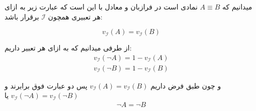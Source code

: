 \documentclass[]{exam}
\begin{document}
میدانیم که
$A \equiv B$
نمادی است در فرازبان و معادل با این است که عبارت زیر به ازای هر تعبیری همچون 
$\mathscr{I}$
برقرار باشد:

$$
v_\mathscr{I} (A) = v_\mathscr{I} (B)
$$

از طرفی میدانیم که به ازای هر تعبیر داریم:
\begin{align*}
    v_\mathscr{I} (\neg A) = 1 - v_\mathscr{I} (A)
    \\
    v_\mathscr{I} (\neg B) = 1 - v_\mathscr{I} (B)
\end{align*}


و چون طبق فرض داریم
$v_\mathscr{I} (A) = v_\mathscr{I} (B)$
پس دو عبارت فوق برابرند و 
$v_\mathscr{I} (\neg A) = v_\mathscr{I} (\neg B)$
یا
\begin{align*}
    \neg A = \neg B
\end{align*}
\end{document}
